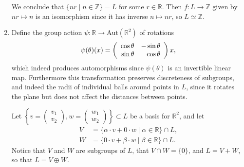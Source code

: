 \documentclass{article}
\begin{document}
\begin{Answer}
\begin{enumerate}
{      We conclude that $\{ n r \mid n \in \mathbb{Z} \} = L$ for some
      $r \in \mathbb{R}$. Then $f : L \to \mathbb{Z}$ given by
      $n r \mapsto n$ is an isomorphism since it has inverse
      $n \mapsto n r$, so $L \simeq \mathbb{Z}$.
    }
    \item{
      Define the group action
      $\psi : \mathbb{R} \to \mathrm{Aut}(\mathbb{R}^2)$
      of rotations
      $$
      \psi(\theta)(x) =
        \left(\begin{array}{r r}
          \cos \theta & -\sin \theta \\
          \sin \theta &  \cos \theta
        \end{array}\right) x,
      $$
      which indeed produces automorphisms since
      $\psi(\theta)$ is an invertible linear map.
      Furthermore this transformation preserves discreteness of
      subgroups, and indeed the radii of individual balls around points
      in $L$, since it rotates the plane but does not affect the
      distances between points.

      Let
      $\left\{
           v = \left(\begin{array}{c}
                 v_1 \\ v_2
               \end{array}\right)
         , w = \left(\begin{array}{c}
                 w_1 \\ w_2
               \end{array}\right)
       \right\} \subset L$ be a basis for
      $\mathbb{R}^2$, and let
      \begin{align*}
      V &= \{ \alpha \cdot v + 0     \cdot w
             \mid \alpha \in \mathbb{R}
           \} \cap L, \\
      W &= \{ 0      \cdot v + \beta \cdot w
             \mid \beta \in \mathbb{R}
          \} \cap L.
      \end{align*}
      Notice that $V$ and $W$ are subgroups of $L$,
      that $V \cap W = \{ 0 \}$, and $L = V + W$, so that
      $L = V \oplus W$.

}
\end{enumerate}
\end{Answer}
\end{document}
